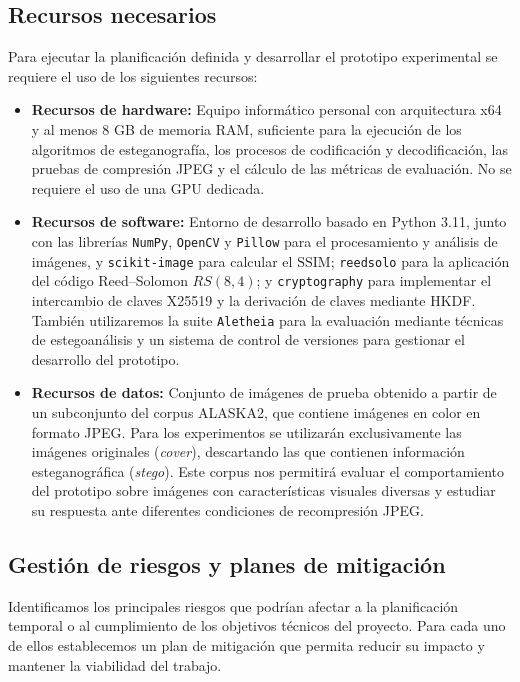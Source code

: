 \documentclass[IB]{TFUOC}%
\begin{document}
\subsection{Recursos necesarios}

Para ejecutar la planificación definida y desarrollar el prototipo experimental se requiere el uso de los siguientes recursos:

\begin{itemize}

\item \textbf{Recursos de hardware:} Equipo informático personal con arquitectura x64 y al menos 8 GB de memoria RAM, suficiente para la ejecución de los algoritmos de esteganografía, los procesos de codificación y decodificación, las pruebas de compresión JPEG y el cálculo de las métricas de evaluación. No se requiere el uso de una $\mathrm{GPU}$ dedicada.

\item \textbf{Recursos de software:} Entorno de desarrollo basado en Python 3.11, junto con las librerías \texttt{NumPy}, \texttt{OpenCV} y \texttt{Pillow} para el procesamiento y análisis de imágenes, y \texttt{scikit-image} para calcular el $\mathrm{SSIM}$; \texttt{reedsolo} para la aplicación del código Reed--Solomon $RS(8,4)$; y \texttt{cryptography} para implementar el intercambio de claves X25519 y la derivación de claves mediante HKDF. También utilizaremos la suite \texttt{Aletheia} \cite{1} para la evaluación mediante técnicas de estegoanálisis y un sistema de control de versiones para gestionar el desarrollo del prototipo.

\item \textbf{Recursos de datos:} Conjunto de imágenes de prueba obtenido a partir de un subconjunto del corpus ALASKA2, que contiene imágenes en color en formato JPEG. Para los experimentos se utilizarán exclusivamente las imágenes originales (\textit{cover}), descartando las que contienen información esteganográfica (\textit{stego}). Este corpus nos permitirá evaluar el comportamiento del prototipo sobre imágenes con características visuales diversas y estudiar su respuesta ante diferentes condiciones de recompresión JPEG.
\end{itemize}

\subsection{Gestión de riesgos y planes de mitigación}

Identificamos los principales riesgos que podrían afectar a la planificación temporal o al cumplimiento de los objetivos técnicos del proyecto. Para cada uno de ellos establecemos un plan de mitigación que permita reducir su impacto y mantener la viabilidad del trabajo.
\end{document}
